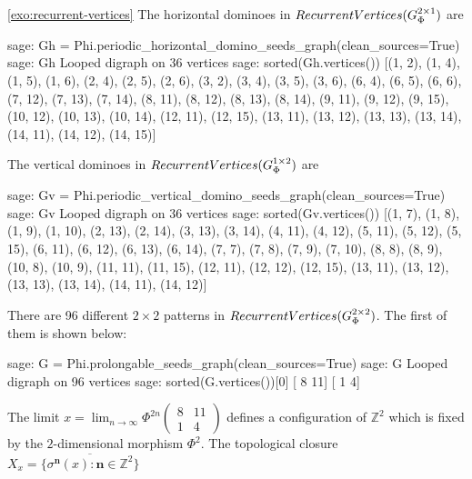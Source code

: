 \documentclass[12pt]{amsart}
\newcommand{\Z}{\mathbb{Z}}
\newcommand{\bn}{{\boldsymbol{n}}}
\newcommand{\topologicalclosure}[1]{{\overline{#1}}}
\newcommand{\RecurrentVertices}{\textsc{RecurrentVertices}}
\begin{document}
\begin{exosolution}{\ref{exo:recurrent-vertices}}
    The horizontal dominoes in $\RecurrentVertices(G^{2\times 1}_\Phi)$ are
\begin{sagecommandlinetcb}
\begin{sagecommandline}
sage: Gh = Phi.periodic_horizontal_domino_seeds_graph(clean_sources=True)
sage: Gh
Looped digraph on 36 vertices
sage: sorted(Gh.vertices())
[(1, 2), (1, 4), (1, 5), (1, 6), (2, 4), (2, 5), (2, 6), (3, 2), (3, 4), (3, 5), (3, 6), (6, 4), (6, 5), (6, 6), (7, 12), (7, 13), (7, 14), (8, 11), (8, 12), (8, 13), (8, 14), (9, 11), (9, 12), (9, 15), (10, 12), (10, 13), (10, 14), (12, 11), (12, 15), (13, 11), (13, 12), (13, 13), (13, 14), (14, 11), (14, 12), (14, 15)]
\end{sagecommandline}
\end{sagecommandlinetcb}
    The vertical dominoes in $\RecurrentVertices(G^{1\times 2}_\Phi)$ are
\begin{sagecommandlinetcb}
\begin{sagecommandline}
sage: Gv = Phi.periodic_vertical_domino_seeds_graph(clean_sources=True)
sage: Gv
Looped digraph on 36 vertices
sage: sorted(Gv.vertices())
[(1, 7), (1, 8), (1, 9), (1, 10), (2, 13), (2, 14), (3, 13), (3, 14), (4, 11), (4, 12), (5, 11), (5, 12), (5, 15), (6, 11), (6, 12), (6, 13), (6, 14), (7, 7), (7, 8), (7, 9), (7, 10), (8, 8), (8, 9), (10, 8), (10, 9), (11, 11), (11, 15), (12, 11), (12, 12), (12, 15), (13, 11), (13, 12), (13, 13), (13, 14), (14, 11), (14, 12)]
\end{sagecommandline}
\end{sagecommandlinetcb}
    There are 96 different $2\times 2$ patterns in
    $\RecurrentVertices(G^{2\times 2}_\Phi)$. The first of them is shown below:
\begin{sagecommandlinetcb}
\begin{sagecommandline}
sage: G = Phi.prolongable_seeds_graph(clean_sources=True)
sage: G
Looped digraph on 96 vertices
sage: sorted(G.vertices())[0]
[ 8 11]
[ 1  4]
\end{sagecommandline}
\end{sagecommandlinetcb}
The limit $x=\lim_{n\to\infty}\Phi^{2n}
\left(\begin{smallmatrix}8&11\\1&4\end{smallmatrix}\right)$
defines a configuration of $\Z^2$ which is fixed by
the $2$-dimensional morphism $\Phi^2$.
The topological closure 
    $X_x=\topologicalclosure{\{\sigma^\bn(x)\colon \bn\in\Z^2\}}$

\end{exosolution}
\end{document}
